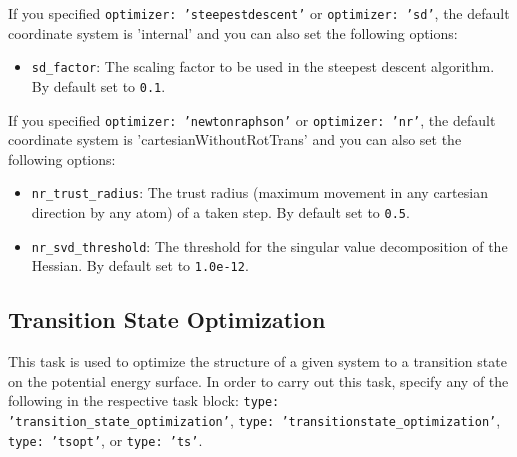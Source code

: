 \documentclass[]{tufte-book}
\begin{document}
If you specified \texttt{optimizer: 'steepestdescent'} or \texttt{optimizer: 'sd'}, the default coordinate system is 'internal'
and you can also set the following options:
\begin{itemize}
\item \texttt{sd\_factor}: The scaling factor to be used in the steepest descent algorithm. By default set to \texttt{0.1}.
\end{itemize}

If you specified \texttt{optimizer: 'newtonraphson'} or \texttt{optimizer: 'nr'}, the default coordinate system is 'cartesianWithoutRotTrans'
and you can also set the following options:
\begin{itemize}
\item \texttt{nr\_trust\_radius}: The trust radius (maximum movement in any cartesian direction by any atom) of a taken step.
By default set to \texttt{0.5}.
\item \texttt{nr\_svd\_threshold}: The threshold for the singular value decomposition of the Hessian. By default set to
\texttt{1.0e-12}.
\end{itemize}

\subsection{Transition State Optimization}

This task is used to optimize the structure of a given system to a transition state on the potential energy surface. In
order to carry out this task, specify any of the following in the respective task block: \texttt{type: 'transition\_state\_optimization'},
\texttt{type: 'transitionstate\_optimization'}, \texttt{type: 'tsopt'}, or \texttt{type: 'ts'}.
\end{document}
